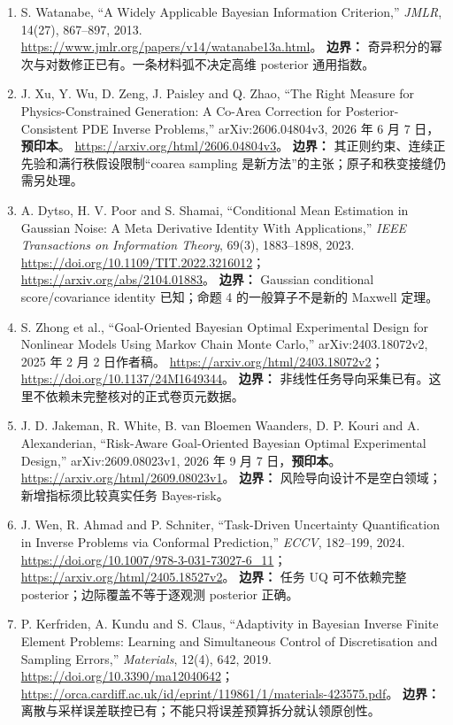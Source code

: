 \begin{enumerate}[label=\textbf{L\arabic*.},leftmargin=3em,itemsep=.7em]
\item S. Watanabe, “A Widely Applicable Bayesian Information Criterion,” \emph{JMLR}, 14(27), 867--897, 2013.
\url{https://www.jmlr.org/papers/v14/watanabe13a.html}。
\textbf{边界：} 奇异积分的幂次与对数修正已有。一条材料弧不决定高维 posterior 通用指数。

\item J. Xu, Y. Wu, D. Zeng, J. Paisley and Q. Zhao, “The Right Measure for Physics-Constrained Generation: A Co-Area Correction for Posterior-Consistent PDE Inverse Problems,” arXiv:2606.04804v3, 2026 年 6 月 7 日，\textbf{预印本}。
\url{https://arxiv.org/html/2606.04804v3}。
\textbf{边界：} 其正则约束、连续正先验和满行秩假设限制“coarea sampling 是新方法”的主张；原子和秩变接缝仍需另处理。

\item A. Dytso, H. V. Poor and S. Shamai, “Conditional Mean Estimation in Gaussian Noise: A Meta Derivative Identity With Applications,” \emph{IEEE Transactions on Information Theory}, 69(3), 1883--1898, 2023.
\url{https://doi.org/10.1109/TIT.2022.3216012}；
\url{https://arxiv.org/abs/2104.01883}。
\textbf{边界：} Gaussian conditional score/covariance identity 已知；命题 4 的一般算子不是新的 Maxwell 定理。

\item S. Zhong et al., “Goal-Oriented Bayesian Optimal Experimental Design for Nonlinear Models Using Markov Chain Monte Carlo,” arXiv:2403.18072v2, 2025 年 2 月 2 日作者稿。
\url{https://arxiv.org/html/2403.18072v2}；
\url{https://doi.org/10.1137/24M1649344}。
\textbf{边界：} 非线性任务导向采集已有。这里不依赖未完整核对的正式卷页元数据。

\item J. D. Jakeman, R. White, B. van Bloemen Waanders, D. P. Kouri and A. Alexanderian, “Risk-Aware Goal-Oriented Bayesian Optimal Experimental Design,” arXiv:2609.08023v1, 2026 年 9 月 7 日，\textbf{预印本}。
\url{https://arxiv.org/html/2609.08023v1}。
\textbf{边界：} 风险导向设计不是空白领域；新增指标须比较真实任务 Bayes-risk。

\item J. Wen, R. Ahmad and P. Schniter, “Task-Driven Uncertainty Quantification in Inverse Problems via Conformal Prediction,” \emph{ECCV}, 182--199, 2024.
\url{https://doi.org/10.1007/978-3-031-73027-6_11}；
\url{https://arxiv.org/html/2405.18527v2}。
\textbf{边界：} 任务 UQ 可不依赖完整 posterior；边际覆盖不等于逐观测 posterior 正确。

\item P. Kerfriden, A. Kundu and S. Claus, “Adaptivity in Bayesian Inverse Finite Element Problems: Learning and Simultaneous Control of Discretisation and Sampling Errors,” \emph{Materials}, 12(4), 642, 2019.
\url{https://doi.org/10.3390/ma12040642}；
\url{https://orca.cardiff.ac.uk/id/eprint/119861/1/materials-423575.pdf}。
\textbf{边界：} 离散与采样误差联控已有；不能只将误差预算拆分就认领原创性。


\end{enumerate}
